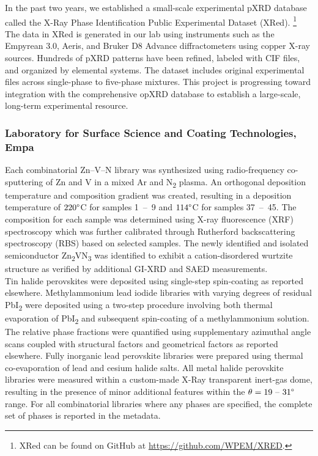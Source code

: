 In the past two years, we established a small-scale experimental pXRD database called the X-Ray Phase Identification Public Experimental Dataset (XRed). \footnote{XRed can be found on GitHub at \url{https://github.com/WPEM/XRED}.} The data in XRed is generated in our lab using instruments such as the Empyrean 3.0, Aeris, and Bruker D8 Advance diffractometers using copper X-ray sources. Hundreds of pXRD patterns have been refined, labeled with CIF files, and organized by elemental systems. The dataset includes original experimental files across single-phase to five-phase mixtures. This project is progressing toward integration with the comprehensive opXRD database to establish a large-scale, long-term experimental resource. 

\subsubsection*{Laboratory for Surface Science and Coating Technologies, Empa}

Each combinatorial Zn–V–N library was synthesized using radio-frequency co-sputtering of Zn and V in a mixed Ar and N\textsubscript{2} plasma. An orthogonal deposition temperature and composition gradient was created, resulting in a deposition temperature of $220\degree$C for samples 1~–~9 and $114\degree$C for samples 37~–~45. The composition for each sample was determined using X-ray fluorescence (XRF) spectroscopy which was further calibrated through Rutherford backscattering spectroscopy (RBS) based on selected samples. The newly identified and isolated semiconductor Zn\textsubscript{2}VN\textsubscript{3} was identified to exhibit a cation-disordered wurtzite structure as verified by additional GI-XRD and SAED measurements. \cite{Zhuk2021} \\
Tin halide perovskites were deposited using single-step spin-coating as reported elsewhere.\cite{Wieczorek2023} Methylammonium lead iodide libraries with varying degrees of residual PbI\textsubscript{2} were deposited using a two-step procedure involving both thermal evaporation of PbI\textsubscript{2} and subsequent spin-coating of a methylammonium solution. The relative phase fractions were quantified using supplementary azimuthal angle scans coupled with structural factors and geometrical factors as reported elsewhere.\cite{Wieczorek2024} Fully inorganic lead perovskite libraries were prepared using thermal co-evaporation of lead and cesium halide salts.
All metal halide perovskite libraries were measured within a custom-made X-Ray transparent inert-gas dome, resulting in the presence of minor additional features within the $\theta=19 \text{~–~}31\degree$ range. For all combinatorial libraries where any phases are specified, the complete set of phases is reported in the metadata. \\

